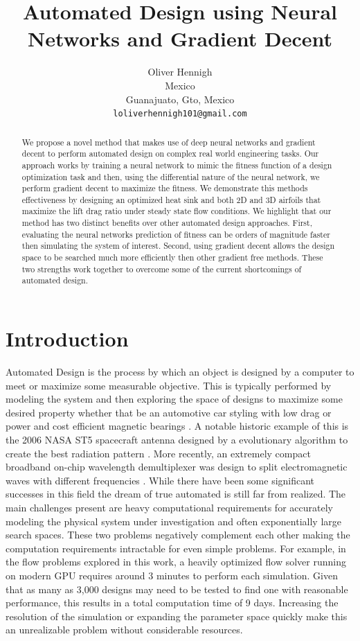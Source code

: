 \documentclass{article} %
\title{Automated Design using Neural Networks and Gradient Decent}
\author{Oliver Hennigh \\
Mexico\\
Guanajuato, Gto, Mexico \\
\texttt{loliverhennigh101@gmail.com} \\
}
\begin{document}
\maketitle

\begin{abstract}

We propose a novel method that makes use of deep neural networks and gradient decent to perform automated design on complex real world engineering tasks. Our approach works by training a neural network to mimic the fitness function of a design optimization task and then, using the differential nature of the neural network, we perform gradient decent to maximize the fitness. We demonstrate this methods effectiveness by designing an optimized heat sink and both 2D and 3D airfoils that maximize the lift drag ratio under steady state flow conditions. We highlight that our method has two distinct benefits over other automated design approaches. First, evaluating the neural networks prediction of fitness can be orders of magnitude faster then simulating the system of interest. Second, using gradient decent allows the design space to be searched much more efficiently then other gradient free methods. These two strengths work together to overcome some of the current shortcomings of automated design.

\end{abstract}

\section{Introduction}

Automated Design is the process by which an object is designed by a computer to meet or maximize some measurable objective. This is typically performed by modeling the system and then exploring the space of designs to maximize some desired property whether that be an automotive car styling with low drag \cite{ando2010automotive} or power and cost efficient magnetic bearings \cite{dyck1996automated} . A notable historic example of this is the 2006 NASA ST5 spacecraft antenna designed by a evolutionary algorithm to create the best radiation pattern \cite{hornbyautomated}. More recently, an extremely compact broadband on-chip wavelength demultiplexer was design to split electromagnetic waves with different frequencies \cite{piggott2015inverse}. While there have been some significant successes in this field the dream of true automated is still far from realized. The main challenges present are heavy computational requirements for accurately modeling the physical system under investigation and often exponentially large search spaces. These two problems negatively complement each other making the computation requirements intractable for even simple problems. For example, in the flow problems explored in this work, a heavily optimized flow solver running on modern GPU requires around 3 minutes to perform each simulation. Given that as many as 3,000 designs may need to be tested to find one with reasonable performance, this results in a total computation time of 9 days. Increasing the resolution of the simulation or expanding the parameter space quickly make this an unrealizable problem without considerable resources.
\end{document}
